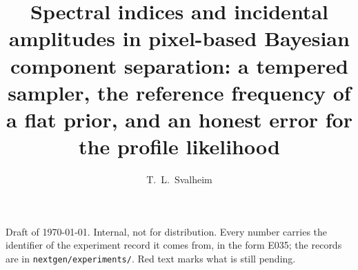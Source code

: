 \documentclass[11pt,a4paper]{article}
\title{\Large Spectral indices and incidental amplitudes in pixel-based Bayesian component separation:
a tempered sampler, the reference frequency of a flat prior, and an honest error for the profile
likelihood}
\author{T.~L.~Svalheim}
\date{}
\newcommand{\exref}[1]{\textsf{\small #1}}
\begin{document}
\maketitle
\begin{center}\parbox{0.9\textwidth}{\small\centering Draft of \today. Internal, not for distribution.
Every number carries the identifier of the experiment record it comes from, in the form \exref{E035};
the records are in \texttt{nextgen/experiments/}. Red text marks what is still pending.}\end{center}











\appendix


\end{document}
